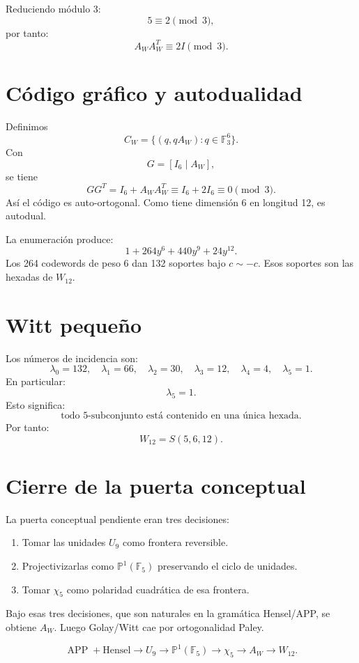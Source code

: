 \documentclass[11pt,a4paper]{article}
\newcommand{\F}{\mathbb F}
\newcommand{\Pone}{\mathbb P^1}
\newcommand{\APP}{\operatorname{APP}}
\begin{document}
Reduciendo módulo 3:
\[
5\equiv2\pmod3,
\]
por tanto:
\[
\boxed{A_WA_W^T\equiv2I\pmod3.}
\]

\section{Código gráfico y autodualidad}
Definimos
\[
C_W=\{(q,qA_W):q\in\F_3^6\}.
\]
Con
\[
G=[I_6\mid A_W],
\]
se tiene
\[
GG^T=I_6+A_WA_W^T\equiv I_6+2I_6\equiv0\pmod3.
\]
Así el código es auto-ortogonal. Como tiene dimensión 6 en longitud 12, es autodual.

La enumeración produce:
\[
\boxed{1+264y^6+440y^9+24y^{12}.}
\]
Los 264 codewords de peso 6 dan 132 soportes bajo \(c\sim-c\). Esos soportes son las hexadas de \(W_{12}\).

\section{Witt pequeño}
Los números de incidencia son:
\[
\lambda_0=132,
\quad
\lambda_1=66,
\quad
\lambda_2=30,
\quad
\lambda_3=12,
\quad
\lambda_4=4,
\quad
\lambda_5=1.
\]
En particular:
\[
\boxed{\lambda_5=1.}
\]
Esto significa:
\[
\boxed{\text{todo 5-subconjunto está contenido en una única hexada}.}
\]
Por tanto:
\[
\boxed{W_{12}=S(5,6,12).}
\]

\section{Cierre de la puerta conceptual}
La puerta conceptual pendiente eran tres decisiones:
\begin{enumerate}[label=\textbf{\arabic*.}]
\item Tomar las unidades \(U_9\) como frontera reversible.
\item Projectivizarlas como \(\Pone(\F_5)\) preservando el ciclo de unidades.
\item Tomar \(\chi_5\) como polaridad cuadrática de esa frontera.
\end{enumerate}
Bajo esas tres decisiones, que son naturales en la gramática Hensel/APP, se obtiene \(A_W\). Luego Golay/Witt cae por ortogonalidad Paley.

\[
\boxed{\APP+\text{Hensel}\to U_9\to\Pone(\F_5)\to\chi_5\to A_W\to W_{12}.}
\]
\end{document}
